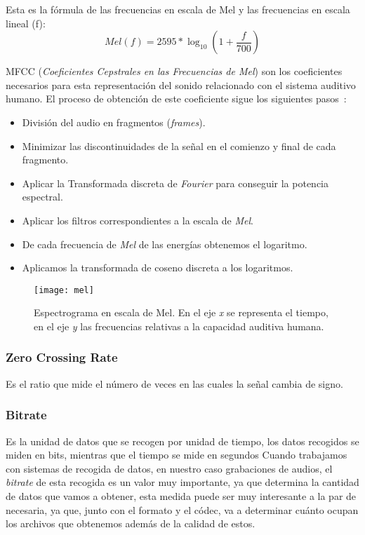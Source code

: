 Esta es la fórmula de las frecuencias en escala de Mel y las frecuencias en escala lineal (f)\cite{wiki:mel,villa2012automatic}: \[ Mel(f) = 2595 * \log_{10}(1+\frac{f}{700})\]

MFCC (\textit{Coeficientes Cepstrales en las Frecuencias de Mel}) son los coeficientes necesarios para esta representación del sonido relacionado con el sistema auditivo humano. El proceso de obtención de este coeficiente sigue los siguientes pasos~\cite{wiki:mel,yeo2011animal}:
\begin{itemize}
	\item División del audio en fragmentos (\textit{frames}).
	\item Minimizar las discontinuidades de la señal en el comienzo y final de cada fragmento.
	\item Aplicar la Transformada discreta de \textit{Fourier} para conseguir la potencia espectral.
	\item Aplicar los filtros correspondientes a la escala de \textit{Mel}.
	\item De cada frecuencia de \textit{Mel} de las energías obtenemos el logaritmo.
	\item Aplicamos la transformada de coseno discreta a los logaritmos.
\end{itemize}
\begin{figure}
	\centering
	\texttt{[image: mel]}
	\caption{Espectrograma en escala de Mel. En el eje \textit{x} se representa el tiempo, en el eje \textit{y} las frecuencias relativas a la capacidad auditiva humana.}
	\label{fig:mel}
\end{figure}

\subsubsection{Zero Crossing Rate} \label{zcr}
Es el ratio que mide el número de veces en las cuales la señal cambia de signo.
\subsubsection{Bitrate}
Es la unidad de datos que se recogen por unidad de tiempo, los datos recogidos se miden en bits, mientras que el tiempo se mide en segundos
Cuando trabajamos con sistemas de recogida de datos, en nuestro caso grabaciones de audios, el \textit{bitrate} de esta recogida es un valor muy importante, ya que determina la cantidad de datos que vamos a obtener, esta medida puede ser muy interesante a la par de necesaria, ya que, junto con el formato y el códec, va a determinar cuánto ocupan los archivos que obtenemos además de la calidad de estos.
